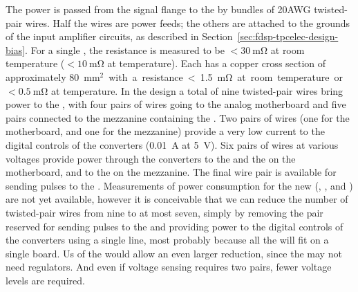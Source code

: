 The  power is passed from the signal flange to the 
 by bundles of \num{20}AWG twisted-pair wires. Half 
the wires are power feeds; the others are attached to the grounds 
of the input amplifier circuits, as described in 
Section~\ref{sec:fdsp-tpcelec-design-bias}.
For a single , the resistance is measured to be 
$<\SI{30}{\milli\ohm}$ at room temperature ($<\SI{10}{\milli\ohm}$ 
at  temperature). Each  has a copper 
cross section of approximately \SI{80}{mm$^2$} with a 
resistance <\SI{1.5}{\milli\ohm} at room temperature or 
$<\SI{0.5}{\milli\ohm}$ at  temperature.
In the  design %
a total of nine 
twisted-pair wires %
bring power to the
, with four pairs of wires going to the analog
motherboard and five pairs connected to the mezzanine containing
the . Two pairs of wires (one for the motherboard,
and one for the mezzanine) %
provide a very low
current to the digital controls of the  converters 
(\SI{0.01}{A} at \SI{5}{V}). Six pairs of wires at %
various voltages %
provide power through the
 converters to the  and the 
on the motherboard, and to the  on the mezzanine.
The final wire pair is available for sending pulses to the
. %
Measurements 
of power consumption for the new  (, 
, and ) are not yet available, however 
it is conceivable that we can  reduce the number of twisted-pair
wires from %
nine %
to at most seven, simply by removing the pair
reserved for sending pulses to the  and %
providing power to the digital 
controls of the  converters using a single line, most probably
because all the  will fit on a single board. 
Us of the  would allow an even larger reduction, %
since the  may not need  regulators.  %
And %
even if voltage sensing requires two pairs, fewer voltage levels are required. %

